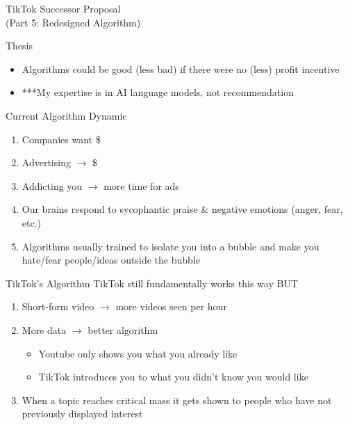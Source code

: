\documentclass[aspectratio=169]{beamer}
\begin{document}
\begin{frame}
    \centering
    \Huge TikTok Successor Proposal \\
    \Huge (Part 5: Redesigned Algorithm)
\end{frame}

\begin{frame}{Thesis}
\vspace{-0.8in}
\begin{itemize}
    \item Algorithms could be good (less bad) if there were no (less) profit incentive
    \item ***My expertise is in AI language models, not recommendation
 \end{itemize}
\end{frame}

\begin{frame}{Current Algorithm Dynamic}
\vspace{-0.6in}
\begin{enumerate}
    \item Companies want \$
    \item Advertising $\rightarrow$ \$
    \item Addicting you $\rightarrow$ more time for ads
    \item Our brains respond to sycophantic praise \& negative emotions (anger, fear, etc.)
    \item Algorithms usually trained to isolate you into a bubble and make you hate/fear people/ideas outside the bubble
\end{enumerate}
\end{frame}

\begin{frame}{TikTok's Algorithm}
\vspace{-0.6in}
TikTok still fundamentally works this way BUT
\begin{enumerate}
    \item Short-form video $\rightarrow$ more videos seen per hour
    \item More data $\rightarrow$ better algorithm
    \begin{itemize}
        \item Youtube only shows you what you already like
        \item TikTok introduces you to what you didn't know you would like
    \end{itemize}
    \item When a topic reaches critical mass it gets shown to people who have not previously displayed interest
\end{enumerate}
\end{frame}
\end{document}
